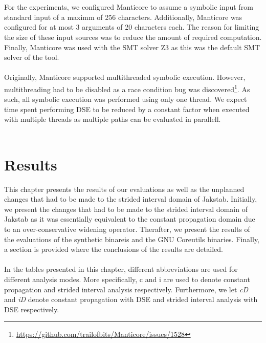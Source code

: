 \documentclass{kththesis}
\newcommand{\fbcomment}[1]{{#1}}
\renewcommand{\fbcomment}[1]{}
\renewcommand{\it}[1]{\textit{#1}}
\begin{document}
\\ \\
For the experiments, we configured Manticore to assume a symbolic input from standard input of a maximm of 256 characters. Additionally, Manticore was configured for at most 3 arguments of 20 characters each. The reason for limiting the size of these input sources was to reduce the amount of required computation. Finally, Manticore was used with the SMT solver Z3 as this was the default SMT solver of the tool.
\\ \\
Originally, Manticore supported multithreaded symbolic execution. However, multithreading had to be disabled as a race condition bug was discovered\footnote{\url{https://github.com/trailofbits/Manticore/issues/1528}}. As such, all symbolic execution was performed using only one thread. We expect time spent performing DSE to be reduced by a constant factor when executed with multiple threads as multiple paths can be evaluated in parallell.
\\ \\

\chapter{Results}\label{chap:results}
\fbcomment{\color{red}Goal: Present the most "interesting" results of the project(Full tables will be put in an appendix).}
This chapter presents the results of our evaluations as well as the unplanned changes that had to be made to the strided interval domain of Jakstab. Initially, we present the changes that had to be made to the strided interval domain of Jakstab as it was essentially equivalent to the constant propagation domain due to an over-conservative widening operator. Therafter, we present the results of the evaluations of the synthetic binareis and the GNU Coreutils binaries. Finally, a section is provided where the conclusions of the results are detailed.
\\ \\
In the tables presented in this chapter, different abbreviations are used for different analysis modes. More specifically, c and i are used to denote constant propagation and strided interval analysis respectively. Furthermore, we let \it{cD} and \it{iD} denote constant propagation with DSE and strided interval analysis with DSE respectively.
\end{document}
